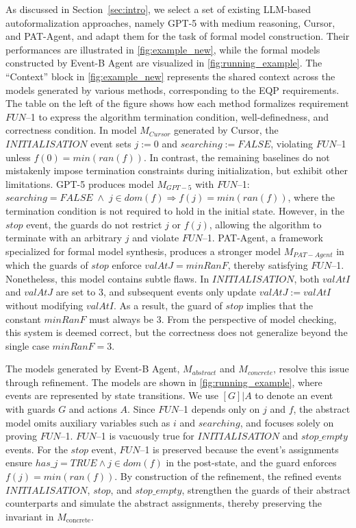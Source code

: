As discussed in Section~\ref{sec:intro}, we select a set of existing LLM-based autoformalization approaches, namely GPT-5 with medium reasoning, Cursor, and PAT-Agent, and adapt them for the task of formal model construction.
Their performances are illustrated in \autoref{fig:example_new}, while the formal models constructed by Event-B Agent are visualized in \autoref{fig:running_example}.
The ``Context'' block in \autoref{fig:example_new} represents the shared context across the models generated by various methods, corresponding to the EQP requirements.
The table on the left of the figure shows how each method formalizes requirement $FUN$--1 to express the algorithm termination condition, well-definedness, and correctness condition.
In model $M_{Cursor}$ generated by Cursor, the $INITIALISATION$ event sets $j:=0$ and $searching:=FALSE$, violating $FUN$--1 unless $f(0)=min(ran(f))$.
In contrast, the remaining baselines do not mistakenly impose termination constraints during initialization, but exhibit other limitations.
GPT-5 produces model $M_{GPT-5}$ with $FUN$--1: $searching=FALSE \; \land \; j \in dom(f) \Rightarrow f(j)=min(ran(f))$, where the termination condition is not required to hold in the initial state.
However, in the $stop$ event, the guards do not restrict $j$ or $f(j)$, allowing the algorithm to terminate with an arbitrary $j$ and violate $FUN$--1.
PAT-Agent, a framework specialized for formal model synthesis, produces a stronger model $M_{PAT-Agent}$ in which the guards of $stop$ enforce $valAtJ=minRanF$, thereby satisfying $FUN$--1.
Nonetheless, this model contains subtle flaws.
In $INITIALISATION$, both $valAtI$ and $valAtJ$ are set to $3$, and subsequent events only update $valAtJ:=valAtI$ without modifying $valAtI$. 
As a result, the guard of $stop$ implies that the constant $minRanF$ must always be $3$. 
From the perspective of model checking, this system is deemed correct, but the correctness does not generalize beyond the single case $minRanF=3$.

The models generated by Event-B Agent, $M_{abstract}$ and $M_{concrete}$, resolve this issue through refinement.
The models are shown in \autoref{fig:running_example}, where events are represented by state transitions.
We use $[G]|A$ to denote an event with guards $G$ and actions $A$.
Since $FUN$--1 depends only on $j$ and $f$, the abstract model omits auxiliary variables such as $i$ and $searching$, and focuses solely on proving $FUN$--1.
$FUN$--1 is vacuously true for $INITIALISATION$ and $stop\_empty$ events.
For the $stop$ event, $FUN$--1 is preserved because the event’s assignments ensure $has\_j = TRUE \land j \in dom(f)$ in the post-state, and the guard enforces $f(j) = min(ran(f))$.
By construction of the refinement, the refined events $INITIALISATION$, $stop$, and $stop\_empty$, strengthen the guards of their abstract counterparts and simulate the abstract assignments, thereby preserving the invariant in $M_{\text{concrete}}$.


